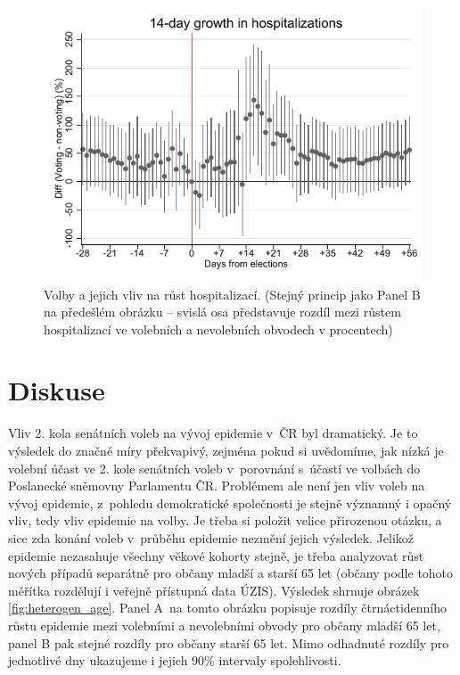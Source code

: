 \begin{figure}[ht]    
    \centering
    \includegraphics[scale=1]{Hospitalization_growth14.pdf}
    \caption{Volby a jejich vliv na růst hospitalizací. (Stejný princip jako Panel B na předešlém obrázku -- svislá osa představuje rozdíl mezi růstem hospitalizací ve volebních a nevolebních obvodech v procentech)}
     \label{fig:hospit_growth}
\end{figure}

\section*{Diskuse}
Vliv 2. kola senátních voleb na vývoj epidemie v~ČR byl dramatický. Je to výsledek do značné míry překvapivý, zejména pokud si uvědomíme, jak nízká je volební účast ve 2. kole senátních voleb v~porovnání s~účastí ve volbách do Poslanecké sněmovny Parlamentu ČR. Problémem ale není jen vliv voleb na vývoj epidemie, z~pohledu demokratické společnosti je stejně významný i opačný vliv, tedy vliv epidemie na volby. Je třeba si položit velice přirozenou otázku, a sice zda konání voleb v~průběhu epidemie nezmění jejich výsledek. Jelikož epidemie nezasahuje všechny věkové kohorty stejně, je třeba analyzovat růst nových případů separátně pro občany mladší a starší 65 let (občany podle tohoto měřítka rozdělují i veřejně přístupná data ÚZIS). Výsledek shrnuje obrázek  \ref{fig:heterogen_age}. Panel A~na tomto obrázku popisuje rozdíly čtrnáctidenního růstu epidemie mezi volebními a nevolebními obvody pro občany mladší 65 let, panel B pak stejné rozdíly pro občany starší 65 let. Mimo odhadnuté rozdíly pro jednotlivé dny ukazujeme i jejich 90\% intervaly spolehlivosti.

